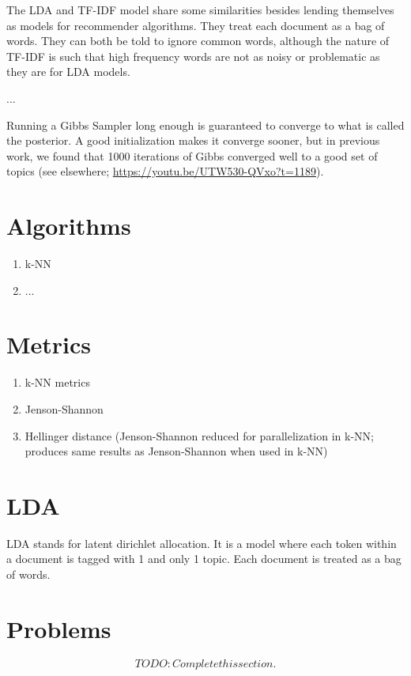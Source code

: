 The LDA and TF-IDF model share some similarities besides lending themselves as models for recommender algorithms. They treat each document as a bag of words. They can both be told to ignore common words, although the nature of TF-IDF is such that high frequency words are not as noisy or problematic as they are for LDA models.

...

Running a Gibbs Sampler long enough is guaranteed to converge to what is called the posterior. A good initialization makes it converge sooner, but in previous work, we found that 1000 iterations of Gibbs converged well to a good set of topics (see elsewhere; \url{https://youtu.be/UTW530-QVxo?t=1189}).

\section{Algorithms}
\begin{enumerate}
  \item k-NN
  \item ...
\end{enumerate}

\section{Metrics}
\begin{enumerate}
  \item k-NN metrics
  \item Jenson-Shannon
  \item Hellinger distance (Jenson-Shannon reduced for parallelization in k-NN; produces same results as Jenson-Shannon when used in k-NN)
\end{enumerate}

\section{LDA}
LDA stands for latent dirichlet allocation. It is a model where each token within a document is tagged with 1 and only 1 topic. Each document is treated as a bag of words.

\section{Problems}
\[TODO: Complete this section.\]

